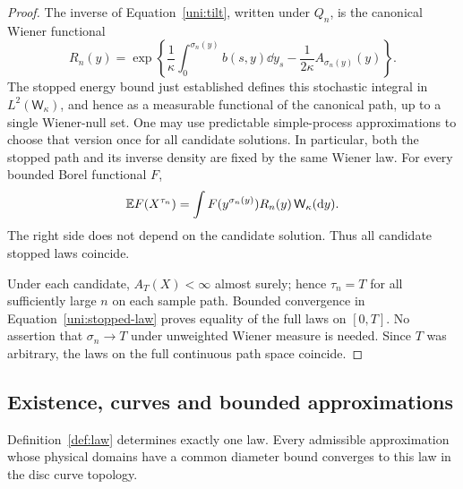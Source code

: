 \begin{proof}
The inverse of Equation~\eqref{uni:tilt}, written under $Q_n$, is
the canonical Wiener functional
\begin{equation}\label{uni:inverse}
 R_n(y)=\exp\left\{\frac1\kappa
       \int_0^{\sigma_n(y)} b(s,y)\dd y_s
       -\frac1{2\kappa}A_{\sigma_n(y)}(y)\right\}.
\end{equation}
The stopped energy bound just established defines this stochastic
integral in $L^2(\mathsf W_\kappa)$, and hence as a measurable
functional of the canonical path, up to a single Wiener-null set.
One may use predictable simple-process approximations to choose
that version once for all candidate solutions. In particular, both
the stopped path and its inverse density are fixed by the same
Wiener law. For every bounded Borel functional $F$,
\begin{equation}\label{uni:stopped-law}
 \mathbb E F(X^{\tau_n})
 =\int F(y^{\sigma_n(y)})R_n(y)\,
                         \mathsf W_\kappa(\mathrm d y).
\end{equation}
The right side does not depend on the candidate solution. Thus all
candidate stopped laws coincide.

Under each candidate, $A_T(X)<\infty$ almost surely; hence
$\tau_n=T$ for all sufficiently large $n$ on each sample path.
Bounded convergence in Equation~\eqref{uni:stopped-law} proves
equality of the full laws on $[0,T]$. No assertion that
$\sigma_n\to T$ under unweighted Wiener measure is needed. Since
$T$ was arbitrary, the laws on the full continuous path space
coincide.
\end{proof}

\subsection{Existence, curves and bounded approximations}

\begin{proposition}\label{uni:bounded}
Definition~\ref{def:law} determines exactly one law. Every
admissible approximation whose physical domains have a common
diameter bound converges to this law in the disc curve topology.
\end{proposition}

